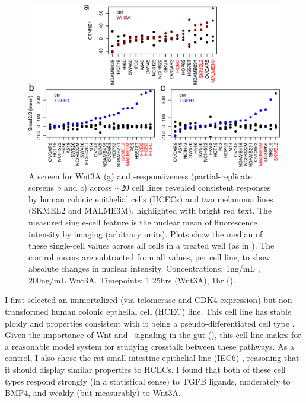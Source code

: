   \begin{figure}[!bt]
  \centering
  \includegraphics[width=6in]{FIGS/insulation/celltypeScreen.pdf}
  {\singlespacing 
  \caption[A screen for Wnt and \tgf\ responsive cell lines.]
        { A screen for Wnt3A (\b{a}) and
          -responsiveness (partial-replicate screens
          \b{b} and \b{c}) 
          across $\sim$20 cell lines revealed consistent
          responses by human colonic epithelial
          cells (HCECs) and two melanoma lines
          (SKMEL2 and MALME3M), highlighted with bright red text.
          The measured single-cell feature is the nuclear
          mean of fluorescence intensity by imaging
          (arbitrary units). Plots show the median
          of these single-cell values across all cells in
          a treated well (as in ).
          The control means are subtracted from all values, per cell line,
          to show absolute changes in nuclear intensity.
          Concentrations: 1ng/mL , 200ng/mL Wnt3A.
          Timepoints: 1.25hrs (Wnt3A), 1hr ().
        }
  \label{fig:insulation:celltypeScreen}}
  \end{figure}


I first selected an immortalized (via telomerase and CDK4 expression)
but non-transformed human colonic epthelial cell (HCEC) line. This
cell line has stable ploidy and properties consistent with it being
a pseudo-differentiated cell type \cite{Roig2010}. Given the importance
of Wnt and \tgfbsf\ signaling in the gut (),
this cell line makes for a
reasonable model system for studying crosstalk between these pathways.
As a control, I also chose the rat small intestine
epithelial line (IEC6) \cite{Quaroni1978},
reasoning that it should display similar properties to HCECs.
I found that both of these
cell types respond strongly (in a statistical sense)
to TGFB ligands, moderately to BMP4,
and weakly (but measurably) to Wnt3A.


